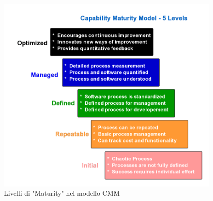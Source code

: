 \documentclass[a4paper, titlepage]{article}
\begin{document}
\begin{figure}[htp]
\centering
\includegraphics[scale=0.30]{Img/CMM.png}
\caption{Livelli di "Maturity" nel modello CMM}
\label{}
\end{figure}

\newpage
\end{document}
